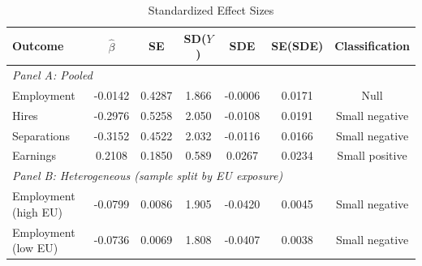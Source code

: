 \begin{table}[t]
\centering
\begin{threeparttable}
\caption{Standardized Effect Sizes}
\label{tab:sde}
\small
\begin{tabular}{lcccccc}
\toprule
Outcome & $\hat{\beta}$ & SE & SD($Y$) & SDE & SE(SDE) & Classification \\
\midrule
\multicolumn{7}{l}{\textit{Panel A: Pooled}} \\
Employment & -0.0142 & 0.4287 & 1.866 & -0.0006 & 0.0171 & Null \\
Hires & -0.2976 & 0.5258 & 2.050 & -0.0108 & 0.0191 & Small negative \\
Separations & -0.3152 & 0.4522 & 2.032 & -0.0116 & 0.0166 & Small negative \\
Earnings & 0.2108 & 0.1850 & 0.589 & 0.0267 & 0.0234 & Small positive \\
\midrule
\multicolumn{7}{l}{\textit{Panel B: Heterogeneous (sample split by EU exposure)}} \\
Employment (high EU) & -0.0799 & 0.0086 & 1.905 & -0.0420 & 0.0045 & Small negative \\
Employment (low EU) & -0.0736 & 0.0069 & 1.808 & -0.0407 & 0.0038 & Small negative \\
\bottomrule
\end{tabular}
\begin{tablenotes}[flushleft]\small

\end{tablenotes}
\end{threeparttable}
\end{table}
